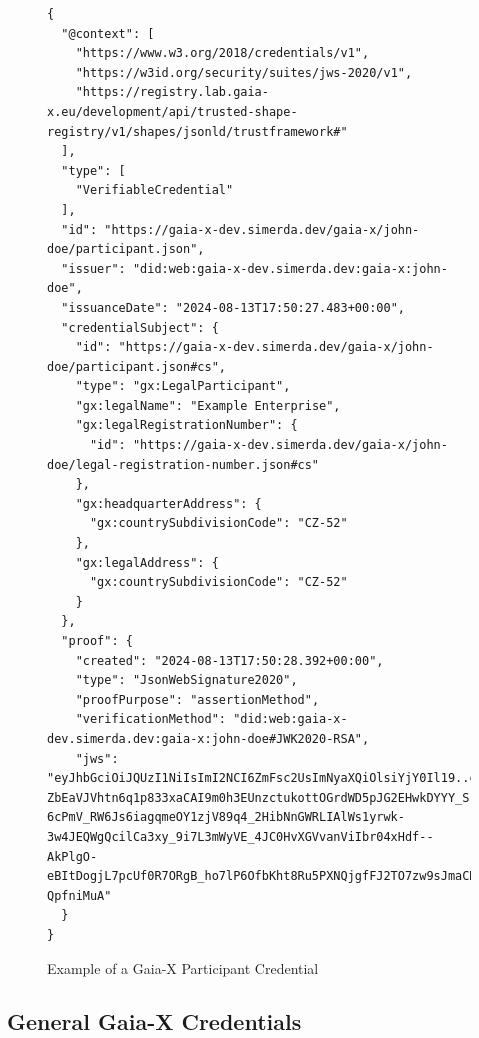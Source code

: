 \begin{figure}
    \centering
    \begin{verbatim}
{
  "@context": [
    "https://www.w3.org/2018/credentials/v1",
    "https://w3id.org/security/suites/jws-2020/v1",
    "https://registry.lab.gaia-x.eu/development/api/trusted-shape-registry/v1/shapes/jsonld/trustframework#"
  ],
  "type": [
    "VerifiableCredential"
  ],
  "id": "https://gaia-x-dev.simerda.dev/gaia-x/john-doe/participant.json",
  "issuer": "did:web:gaia-x-dev.simerda.dev:gaia-x:john-doe",
  "issuanceDate": "2024-08-13T17:50:27.483+00:00",
  "credentialSubject": {
    "id": "https://gaia-x-dev.simerda.dev/gaia-x/john-doe/participant.json#cs",
    "type": "gx:LegalParticipant",
    "gx:legalName": "Example Enterprise",
    "gx:legalRegistrationNumber": {
      "id": "https://gaia-x-dev.simerda.dev/gaia-x/john-doe/legal-registration-number.json#cs"
    },
    "gx:headquarterAddress": {
      "gx:countrySubdivisionCode": "CZ-52"
    },
    "gx:legalAddress": {
      "gx:countrySubdivisionCode": "CZ-52"
    }
  },
  "proof": {
    "created": "2024-08-13T17:50:28.392+00:00",
    "type": "JsonWebSignature2020",
    "proofPurpose": "assertionMethod",
    "verificationMethod": "did:web:gaia-x-dev.simerda.dev:gaia-x:john-doe#JWK2020-RSA",
    "jws": "eyJhbGciOiJQUzI1NiIsImI2NCI6ZmFsc2UsImNyaXQiOlsiYjY0Il19..cPShjGoSpCKGfjU6pvjQnGeXCiN36smCdSpkPwp6Ruf24bSzvKQ2Slg9mve84-ZbEaVJVhtn6q1p833xaCAI9m0h3EUnzctukottOGrdWD5pJG2EHwkDYYY_SrfOT_Y7uIYaSf46_2FPAzvHxGoTRGPkvR-6cPmV_RW6Js6iagqmeOY1zjV89q4_2HibNnGWRLIAlWs1yrwk-3w4JEQWgQcilCa3xy_9i7L3mWyVE_4JC0HvXGVvanViIbr04xHdf--AkPlgO-eBItDogjL7pcUf0R7ORgB_ho7lP6OfbKht8Ru5PXNQjgfFJ2TO7zw9sJmaCRCqenCjn-QpfniMuA"
  }
}
    \end{verbatim}
    \caption{Example of a Gaia-X Participant Credential}\label{fig:gaia_x_credential_example}
\end{figure}

\subsection{General Gaia-X Credentials}\label{subsec:general-gaia-x-credentials}

